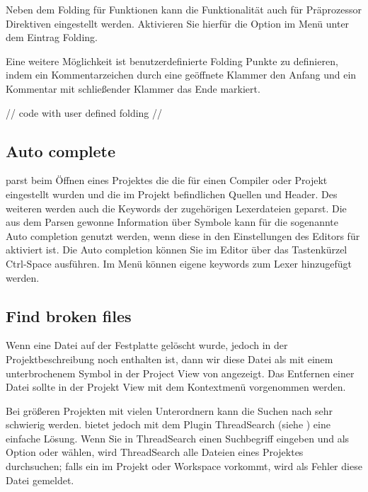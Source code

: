 
Neben dem Folding für Funktionen kann die Funktionalität auch für Präprozessor Direktiven eingestellt werden. Aktivieren Sie hierfür die Option  im Menü
 unter dem Eintrag Folding.

Eine weitere Möglichkeit ist benutzerdefinierte Folding Punkte zu definieren, indem ein Kommentarzeichen durch eine geöffnete Klammer den Anfang und ein Kommentar mit schließender Klammer das Ende markiert.

\begin{code}
//{
code with user defined folding
//}
\end{code}

\subsection{Auto complete}

\codeblocks parst beim Öffnen eines Projektes die  die für einen Compiler oder Projekt eingestellt wurden und die im Projekt befindlichen Quellen und Header. Des weiteren werden auch die Keywords der zugehörigen Lexerdateien geparst. Die aus dem Parsen gewonne Information über Symbole kann für die sogenannte Auto completion genutzt werden, wenn diese in den Einstellungen des Editors für \codeblocks aktiviert ist. Die Auto completion können Sie im Editor über das Tastenkürzel Ctrl-Space ausführen. Im Menü  können eigene keywords zum Lexer hinzugefügt werden.

\subsection{Find broken files}

Wenn eine Datei auf der Festplatte gelöscht wurde, jedoch in der Projektbeschreibung  noch enthalten ist, dann wir diese Datei als  mit einem unterbrochenem Symbol in der Project View von \codeblocks angezeigt. Das Entfernen einer Datei sollte in der Projekt View mit dem Kontextmenü  vorgenommen werden.

Bei größeren Projekten mit vielen Unterordnern kann die Suchen nach  sehr schwierig werden. \codeblocks bietet jedoch mit dem Plugin ThreadSearch (siehe ) eine einfache Lösung. Wenn Sie in ThreadSearch einen Suchbegriff eingeben und als Option  oder  wählen, wird ThreadSearch alle Dateien eines Projektes durchsuchen; falls ein  im Projekt oder Workspace vorkommt, wird als Fehler diese Datei gemeldet.


